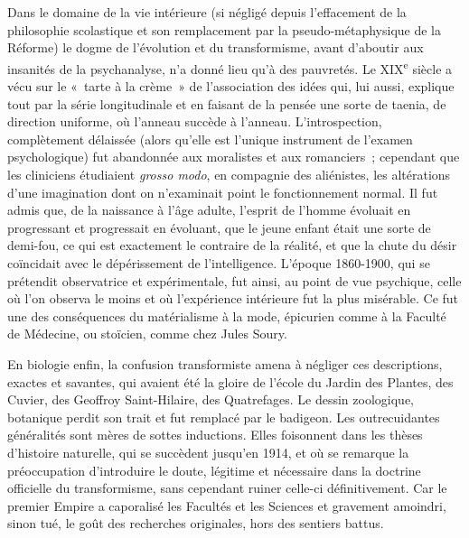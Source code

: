\documentclass[french,twoside]{book} %
\begin{document}
Dans le domaine de la vie intérieure (si négligé depuis l’effacement de la philosophie scolastique et son remplacement par la pseudo-métaphysique de la Réforme) le dogme de l’évolution et du transformisme, avant d’aboutir aux insanités de la psychanalyse, n’a donné lieu qu’à des pauvretés. Le XIX\textsuperscript{e} siècle a vécu sur le « tarte à la crème » de l’association des idées qui, lui aussi, explique tout par la série longitudinale et en faisant de la pensée une sorte de taenia, de direction uniforme, où l’anneau succède à l’anneau. L’introspection, complètement délaissée (alors qu’elle est l’unique instrument de l’examen psychologique) fut abandonnée aux moralistes et aux romanciers ; cependant que les cliniciens étudiaient {\itshape grosso modo}, en compagnie des aliénistes, les altérations d’une imagination dont on n’examinait point le fonctionnement normal. Il fut admis que, de la naissance à l’âge adulte, l’esprit de l’homme évoluait en progressant et progressait en évoluant, que le jeune enfant était une sorte de demi-fou, ce qui est exactement le contraire de la réalité, et que la chute du désir coïncidait avec le dépérissement de l’intelligence. L’époque 1860-1900, qui se prétendit observatrice et expérimentale, fut ainsi, au point de vue psychique, celle où l’on observa le moins et où l’expérience intérieure fut la plus misérable. Ce fut une des conséquences du matérialisme à la mode, épicurien comme à la Faculté de Médecine, ou stoïcien, comme chez Jules Soury.\par
En biologie enfin, la confusion transformiste amena à négliger ces descriptions, exactes et savantes, qui avaient été la gloire de l’école du Jardin des Plantes, des Cuvier, des Geoffroy Saint-Hilaire, des Quatrefages. Le dessin zoologique, botanique perdit son trait et fut remplacé par le badigeon. Les outrecuidantes généralités sont mères de sottes inductions. Elles foisonnent dans les thèses d’histoire naturelle, qui se succèdent jusqu’en 1914, et où se remarque la préoccupation d’introduire le doute, légitime et nécessaire dans la doctrine officielle du transformisme, sans cependant ruiner celle-ci définitivement. Car le premier Empire a caporalisé les Facultés et les Sciences et gravement amoindri, sinon tué, le goût des recherches originales, hors des sentiers battus.\par
\end{document}
